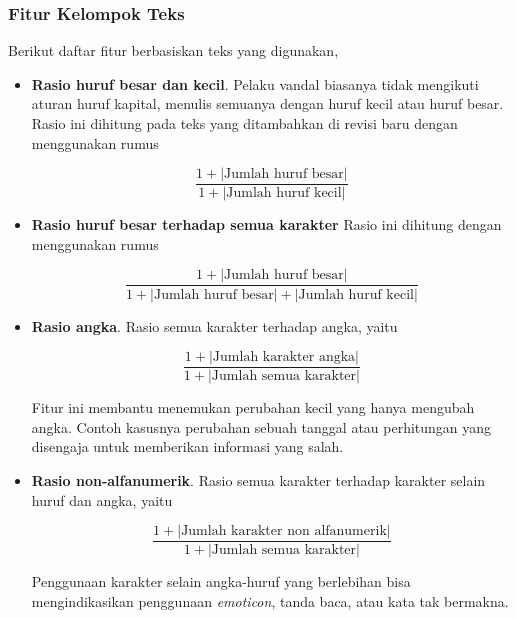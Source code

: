 \subsubsection{Fitur Kelompok Teks}

Berikut daftar fitur berbasiskan teks yang digunakan,

\begin{itemize}

\item \textbf{Rasio huruf besar dan kecil}.
Pelaku vandal biasanya tidak mengikuti aturan huruf kapital, menulis semuanya
dengan huruf kecil atau huruf besar.
Rasio ini dihitung pada teks yang ditambahkan di revisi baru dengan menggunakan
rumus

\begin{equation}
\frac{1 + |\text{Jumlah huruf besar}|}{1 + |\text{Jumlah huruf kecil}|}
\end{equation}

\item \textbf{Rasio huruf besar terhadap semua karakter}
Rasio ini dihitung dengan menggunakan rumus

\begin{equation}
\frac{1 + |\text{Jumlah huruf besar}|}%
	{1 + |\text{Jumlah huruf besar}| + |\text{Jumlah huruf kecil}|}
\end{equation}

\item \textbf{Rasio angka}.
Rasio semua karakter terhadap angka, yaitu

\begin{equation}
\frac{1 + |\text{Jumlah karakter angka}|}{1 + |\text{Jumlah semua karakter}|}
\end{equation}

Fitur ini membantu menemukan perubahan kecil yang hanya mengubah angka.
Contoh kasusnya perubahan sebuah tanggal atau perhitungan yang disengaja untuk
memberikan informasi yang salah.

\item \textbf{Rasio non-alfanumerik}.
Rasio semua karakter terhadap karakter selain huruf dan angka, yaitu

\begin{equation}
\frac{1 + |\text{Jumlah karakter non alfanumerik}|}%
	{1 + |\text{Jumlah semua karakter}|}
\end{equation}

Penggunaan karakter selain angka-huruf yang berlebihan bisa mengindikasikan
penggunaan \textit{emoticon}, tanda baca, atau kata tak bermakna.


\end{itemize}
